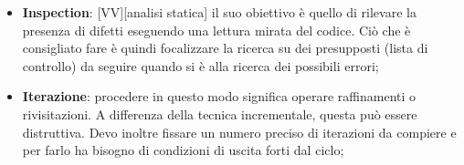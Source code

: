 \begin{itemize}
	\item \textbf{Inspection}: [VV][analisi statica] il suo obiettivo è quello di rilevare la presenza di difetti eseguendo una lettura mirata del codice. Ciò che è consigliato fare è quindi focalizzare la ricerca su dei presupposti (lista di controllo) da seguire quando si è alla ricerca dei possibili errori;

	\item \textbf{Iterazione}: procedere in questo modo significa operare raffinamenti o rivisitazioni. A differenza della tecnica incrementale, questa può essere distruttiva. \newline
Devo inoltre fissare un numero preciso di iterazioni da compiere e per farlo ha bisogno di condizioni di uscita forti dal ciclo;

\end{itemize}